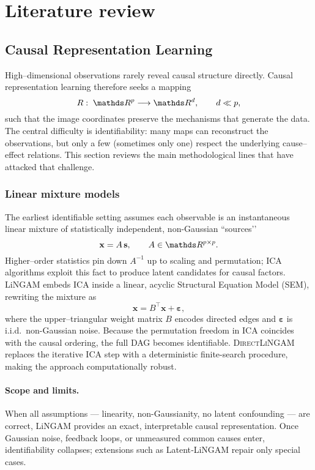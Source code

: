 \documentclass[14pt]{extarticle}
\begin{document}
	\section{Literature review}
	
	\subsection{Causal Representation Learning} \label{sec:causal-dim-red}
	High–dimensional observations rarely reveal causal structure directly.  
	Causal representation learning therefore seeks a mapping
	\[
	R:\;\dR^{p} \longrightarrow \dR^{d},
	\qquad d\ll p,
	\]
	such that the image coordinates preserve the mechanisms that generate the data.  
	The central difficulty is identifiability: many maps can reconstruct the observations, but only a few (sometimes only one) respect the underlying cause–effect relations.  
	This section reviews the main methodological lines that have attacked that challenge.
	
	\subsubsection*{Linear mixture models}
	
	The earliest identifiable setting assumes each observable is an instantaneous linear mixture of statistically independent, non-Gaussian “sources’’  
	\[
	\mathbf{x} = A \,\mathbf{s}, \qquad A \in \dR^{p\times p}.
	\]
	Higher–order statistics pin down $A^{-1}$ up to scaling and permutation; ICA algorithms \citep{lee1998independent} exploit this fact to produce latent candidates for causal factors.  
	LiNGAM \citep{Shimizu2006} embeds ICA inside a linear, acyclic Structural Equation Model (SEM), rewriting the mixture as  
	\[
	\mathbf{x}=B^{\top}\mathbf{x}+\boldsymbol\varepsilon,
	\]
	where the upper–triangular weight matrix $B$ encodes directed edges and $\boldsymbol\varepsilon$ is i.i.d.\ non-Gaussian noise.  
	Because the permutation freedom in ICA coincides with the causal ordering, the full DAG becomes identifiable.  
	\textsc{DirectLiNGAM} \citep{Shimizu2011} replaces the iterative ICA step with a deterministic finite-search procedure, making the approach computationally robust.
	
	\paragraph{Scope and limits.}
	When all assumptions — linearity, non-Gaussianity, no latent confounding — are correct, LiNGAM provides an exact, interpretable causal representation.  
	Once Gaussian noise, feedback loops, or unmeasured common causes enter, identifiability collapses; extensions such as Latent‐LiNGAM repair only special cases.  
	
\end{document}
